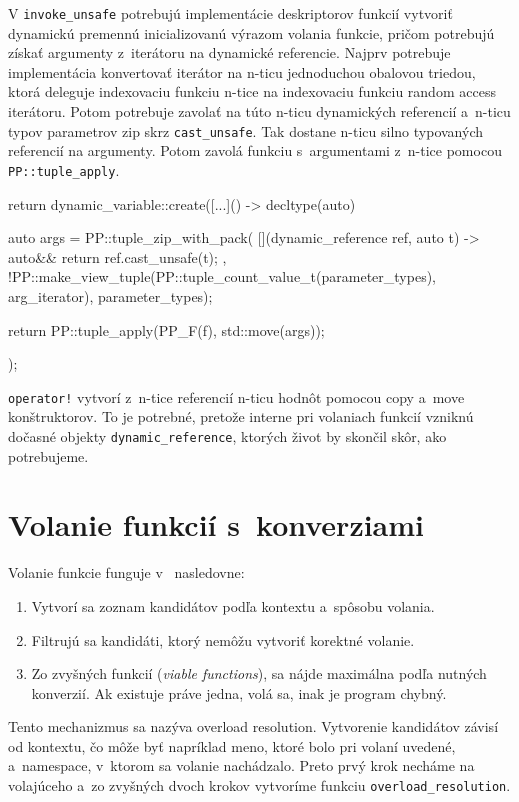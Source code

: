 V \texttt{invoke\_unsafe} potrebujú implementácie deskriptorov funkcií vytvoriť dynamickú premennú inicializovanú výrazom volania funkcie, pričom potrebujú získať argumenty z~iterátoru na dynamické referencie. Najprv potrebuje implementácia konvertovať iterátor na n-ticu jednoduchou obalovou triedou, ktorá deleguje indexovaciu funkciu n-tice na indexovaciu funkciu random access iterátoru. Potom potrebuje zavolať na túto n-ticu dynamických referencií a~n-ticu typov parametrov zip skrz \texttt{cast\_unsafe}. Tak dostane n-ticu silno typovaných referencií na argumenty. Potom zavolá funkciu s~argumentami z~n-tice pomocou \texttt{PP::tuple\_apply}.
\begin{code}
return dynamic_variable::create([...]() -> decltype(auto)
{   auto args = PP::tuple_zip_with_pack(
        [](dynamic_reference ref, auto t) -> auto&&
        { return ref.cast_unsafe(t); },
        !PP::make_view_tuple(PP::tuple_count_value_t(parameter_types),
                             arg_iterator),
        parameter_types);
    
    return PP::tuple_apply(PP_F(f), std::move(args));
});
\end{code}
\texttt{operator!} vytvorí z~n-tice referencií n-ticu hodnôt pomocou copy a~move konštruktorov. To je potrebné, pretože interne pri volaniach funkcií vzniknú dočasné objekty \texttt{dynamic\_reference}, ktorých život by skončil skôr, ako potrebujeme.

\section{Volanie funkcií s~konverziami}

Volanie funkcie funguje v~\Cpp{} nasledovne:

\begin{enumerate}
    \item Vytvorí sa zoznam kandidátov podľa kontextu a~spôsobu volania.
    \item Filtrujú sa kandidáti, ktorý nemôžu vytvoriť korektné volanie.
    \item Zo zvyšných funkcií (\emph{viable functions}), sa nájde maximálna podľa nutných konverzií. Ak existuje práve jedna, volá sa, inak je program chybný.
\end{enumerate}
Tento mechanizmus sa nazýva overload resolution. Vytvorenie kandidátov závisí od kontextu, čo môže byť napríklad meno, ktoré bolo pri volaní uvedené, a~namespace, v~ktorom sa volanie nachádzalo. Preto prvý krok necháme na volajúceho a~zo zvyšných dvoch krokov vytvoríme funkciu \texttt{overload\_resolution}.


